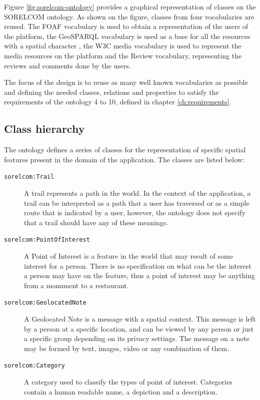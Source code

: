 Figure \ref{fig:sorelcom-ontology} provides a graphical representation of classes on the SORELCOM ontology. As shown on the figure, classes from four vocabularies are reused. The FOAF vocabulary is used to obtain a representation of the users of the platform, the GeoSPARQL vocabulary is used as a base for all the resources with a spatial character , the W3C media vocabulary is used to represent the media resources on the platform and the Review vocabulary, representing the reviews and comments done by the users.

The focus of the design is to reuse as many well known vocabularies as possible and defining the needed classes, relations and properties to satisfy the requirements of the ontology 4 to 10, defined in chapter \ref{ch:requirements}.

\subsection{Class hierarchy}

The ontology defines a series of classes for the representation of specific spatial features present in the domain of the application. The classes are listed below:

\begin{description}
\item[\texttt{sorelcom:Trail}] A trail represents a path in the world. In the context of the application, a trail can be interpreted as a path that a user has traversed or as a simple route that is indicated by a user, however, the ontology does not specify that a trail should have any of these meanings.

\item[\texttt{sorelcom:PointOfInterest}] A Point of Interest is a feature in the world that may result of some interest for a person. There is no specification on what can be the interest a person may have on the feature, thus a point of interest may be anything from a monument to a restaurant.

\item[\texttt{sorelcom:GeolocatedNote}] A Geolocated Note is a message with a spatial context. This message is left by a person at a specific location, and can be viewed by any person or just a specific group depending on its privacy settings. The message on a note may be formed by text, images, video or any combination of them.

\item[\texttt{sorelcom:Category}] A category used to classify the types of point of interest. Categories contain a human readable name, a depiction and a description.

\end{description} 


